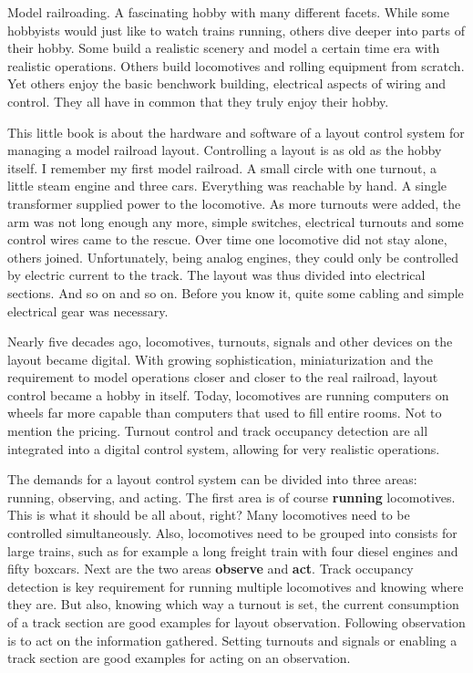 
Model railroading. A fascinating hobby with many different facets. While some hobbyists would just like to watch trains running, others dive deeper into parts of their hobby. Some build a realistic scenery and model a certain time era with realistic operations. Others build locomotives and rolling equipment from scratch. Yet others enjoy the basic benchwork building, electrical aspects of wiring and control. They all have in common that they truly enjoy their hobby.

This little book is about the hardware and software of a layout control system for managing a model railroad layout. Controlling a layout is as old as the hobby itself. I remember my first model railroad. A small circle with one turnout, a little steam engine and three cars. Everything was reachable by hand. A single transformer supplied power to the locomotive. As more turnouts were added, the arm was not long enough any more, simple switches, electrical turnouts and some control wires came to the rescue. Over time one locomotive did not stay alone, others joined. Unfortunately, being analog engines, they could only be controlled by electric current to the track. The layout was thus divided into electrical sections. And so on and so on. Before you know it, quite some cabling and simple electrical gear was necessary.

Nearly five decades ago, locomotives, turnouts, signals and other devices on the layout became digital. With growing sophistication, miniaturization and the requirement to model operations closer and closer to the real railroad, layout control became a hobby in itself. Today, locomotives are running computers on wheels far more capable than computers that used to fill entire rooms. Not to mention the pricing. Turnout control and track occupancy detection are all integrated into a digital control system, allowing for very realistic operations.

The demands for a layout control system can be divided into three areas: running, observing, and acting. The first area is of course {\bf running} locomotives. This is what it should be all about, right? Many locomotives need to be controlled simultaneously. Also, locomotives need to be grouped into consists for large trains, such as for example a long freight train with four diesel engines and fifty boxcars. Next are the two areas {\bf observe} and {\bf act}. Track occupancy detection is key requirement for running multiple locomotives and knowing where they are. But also, knowing which way a turnout is set, the current consumption of a track section are good examples for layout observation. Following observation is to act on the information gathered. Setting turnouts and signals or enabling a track section are good examples for acting on an observation.

